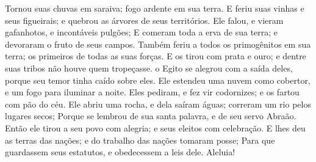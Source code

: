 {  Tornou suas chuvas em saraiva;
{} fogo ardente em sua terra.
  E feriu suas vinhas e seus figueirais; e quebrou as árvores de seus territórios.
  Ele falou, e vieram gafanhotos, e incontáveis pulgões;
  E comeram toda a erva de sua terra; e devoraram o fruto de seus campos.
  Também feriu a todos os primogênitos em sua terra; os primeiros de todas as suas forças.
  E os tirou
{} com prata e ouro; e dentre suas tribos não houve quem tropeçasse.
   o Egito se alegrou com a saída deles, porque seu temor tinha caído sobre eles.
  Ele estendeu uma nuvem como cobertor, e um fogo para iluminar a noite.
  Eles pediram, e fez vir codornizes; e os fartou com pão do céu.
  Ele abriu uma rocha, e dela saíram águas;
{} correram
{} um rio pelos lugares secos;
  Porque se lembrou de sua santa palavra, e de seu servo Abraão.
  Então ele tirou
{} a seu povo com alegria; e seus eleitos com celebração.
  E lhes deu as terras das nações; e do trabalho das nações tomaram posse;
  Para que guardassem seus estatutos, e obedecessem a leis dele. Aleluia!
\par }

